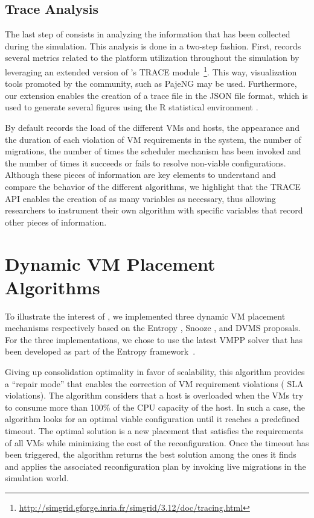 \subsection{Trace Analysis}
\label{subsec:traces-analysis}

The last step of \vmps consists in analyzing the information that has
been collected during the simulation.
This analysis is done in a two-step fashion. First, \vmps records
several metrics related to the platform utilization throughout the
simulation by leveraging an extended version of \sg's TRACE
module~\footnote{\url{http://simgrid.gforge.inria.fr/simgrid/3.12/doc/tracing.html}}.
This way, visualization tools promoted by the \sg community, such as
PajeNG \cite{pageng:www} may be used. Furthermore, our extension
enables the creation of a trace file in the JSON file format, which is
used to generate several figures using the R statistical environment
\cite{R:Bloomfield:2014}.

By default \vmps records the load of the different VMs and hosts, the
appearance and the duration of each violation of VM requirements in
the system, the number of migrations, the number of times the
scheduler mechanism has been invoked and the number of times it
succeeds or fails to resolve non-viable configurations.
%
Although these pieces of information are key elements to understand
and compare the behavior of the different algorithms, we highlight
that the TRACE API enables the creation of as many variables as
necessary, thus allowing researchers to instrument their own algorithm
with specific variables that record other pieces of information.

\section{Dynamic VM Placement Algorithms}
\label{sec:vm-schedulers}
To illustrate the interest of \vmps, we implemented three dynamic VM
placement mechanisms respectively based on the Entropy
\cite{Hermenier:2009:ECM:1508293.1508300}, Snooze
\cite{feller:ccgrid12}, and DVMS \cite{quesnel:cpe2012} proposals. For the three
implementations, we chose to use the latest VMPP solver that has been
developed as part of the Entropy
framework~\cite{Hermenier:2009:ECM:1508293.1508300, hermenier:cp11}.

%
Giving up consolidation
optimality in favor of scalability, this algorithm provides a ``repair
mode'' that enables the correction of VM requirement violations (\aka
SLA violations). The algorithm considers that a host is
overloaded when the VMs try to consume more than 100\% of the CPU
capacity of the host. In such a case, the algorithm looks for
an optimal viable configuration until it reaches a predefined timeout.
The optimal solution is a new placement that satisfies
the requirements of all VMs while minimizing the cost of the
reconfiguration.
Once the timeout has been triggered, the algorithm returns
the best solution among the ones it finds and applies the associated
reconfiguration plan by invoking live migrations in the simulation
world.

